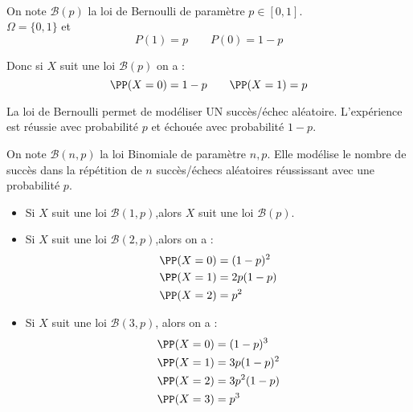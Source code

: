 \documentclass[12pt,fleqn]{report} %
\begin{document}
\begin{example}\text{ }\\
	On note $\mathcal{B}(p)$ la loi de Bernoulli de paramètre $p \in [0,1]$.\\
	$\Omega = \lbrace 0,1 \rbrace$ et \[ P(1) = p \qquad P(0) = 1-p \]
	
	Donc si $X$ suit une loi $\mathcal{B}(p)$ on a : \[
	\PP(X = 0) = 1 - p \qquad \PP(X = 1) = p
	\]
	
	La loi de Bernoulli permet de modéliser UN succès/échec aléatoire. L'expérience est réussie avec probabilité $p$ et échouée avec probabilité $1 - p$.
	
	
\end{example}
\begin{example}
	On note $\mathcal{B}(n,p)$ la loi Binomiale de paramètre $n,p$. Elle modélise le nombre de succès dans la répétition de $n$ succès/échecs aléatoires réussissant avec une probabilité $p$.\\
	\begin{itemize}
		\item Si $X$ suit une loi $\mathcal{B}(1,p)$,alors $X$ suit une loi $\mathcal{B}(p)$.
		\item Si $X$ suit une loi $\mathcal{B}(2,p)$,alors on a :
		\begin{align*}
		\PP(X = 0) & = (1-p)^2 \\ \PP(X = 1) &= 2p(1-p) \\ \PP(X = 2) &= p^2
		\end{align*}
		\item Si $X$ suit une loi $\mathcal{B}(3,p)$, alors on a :
		\begin{align*}
		\PP(X = 0) &= (1 - p)^3 \\
		\PP(X = 1) &= 3p(1 - p)^2 \\
		\PP(X = 2) &= 3p^2(1 -p)\\
		\PP(X = 3) &= p^3
		\end{align*}
	\end{itemize}
	
\end{example}
\end{document}
